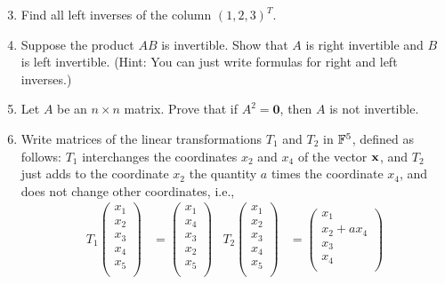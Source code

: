 \documentclass[../psets.tex]{subfiles}
\begin{document}
\begin{enumerate}[label={\textbf{6.\arabic*.}}]
    \setcounter{enumi}{2}
    \item Find all left inverses of the column $(1,2,3)^T$.
    \setcounter{enumi}{5}
    \item Suppose the product $AB$ is invertible. Show that $A$ is right invertible and $B$ is left invertible. (Hint: You can just write formulas for right and left inverses.)
    \item Let $A$ be an $n\times n$ matrix. Prove that if $A^2=\bm{0}$, then $A$ is not invertible.
    \item Write matrices of the linear transformations $T_1$ and $T_2$ in $\mathbb{F}^5$, defined as follows: $T_1$ interchanges the coordinates $x_2$ and $x_4$ of the vector $\mathbf{x}$, and $T_2$ just adds to the coordinate $x_2$ the quantity $a$ times the coordinate $x_4$, and does not change other coordinates, i.e.,
    \begin{align*}
        T_1
        \begin{pmatrix}
            x_1\\
            x_2\\
            x_3\\
            x_4\\
            x_5\\
        \end{pmatrix}
        &=
        \begin{pmatrix}
            x_1\\
            x_4\\
            x_3\\
            x_2\\
            x_5\\
        \end{pmatrix}&
        T_2
        \begin{pmatrix}
            x_1\\
            x_2\\
            x_3\\
            x_4\\
            x_5\\
        \end{pmatrix}
        &=
        \begin{pmatrix}
            x_1\\
            x_2+ax_4\\
            x_3\\
            x_4\\

\end{pmatrix}
\end{align*}
\end{enumerate}
\end{document}
